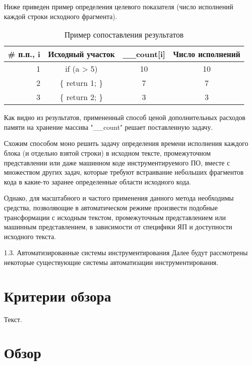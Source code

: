 Ниже приведен пример определения целевого показателя (число исполнений каждой строки исходного фрагмента).
\begin{table}
\captionsetup{skip=5pt}
\caption{Пример сопоставления результатов}
\centering
  \begin{tabular}{|r|c|c|c|}
  \hline
  \# п.п., i  & Исходный участок  & \_\_count[i]  & Число исполнений  \\ \hline
  1           & if (a > 5)        & 10            & 10                \\ \hline
  2           & \{ return 1; \}   & 7             & 7                 \\ \hline
  3           & \{ return 2; \}   & 3             & 3                 \\ \hline
  \end{tabular}
\label{table:checkResults}
\end{table}

Как видно из результатов, примененный способ ценой дополнительных расходов памяти на хранение массива "\_\_count" решает поставленную задачу.

Схожим способом моно решить задачу определения времени исполнения каждого блока (и отдельно взятой строки) в исходном тексте, промежуточном представлении или даже машинном коде инструментируемого ПО, вместе с множеством других задач, которые требуют встраивание небольших фрагментов кода в какие-то заранее определенные области исходного кода.

Однако, для масштабного и частого применения данного метода необходимы средства, позволяющие в автоматическом режиме произвести подобные трансформации с исходным текстом, промежуточным представлением или машинным представлением, в зависимости от специфики ЯП и доступности исходного текста.

1.3. Автоматизированные системы инструментирования
Далее будут рассмотрены некоторые существующие системы автоматизации инструментирования.

\section{Критерии обзора}

Текст.

\section{Обзор}

